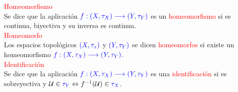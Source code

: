 \documentclass{article}
\begin{document}
\textcolor{red}{Homeomorfismo}\\
Se dice que la aplicación $\textcolor{blue}{f:(X,\tau_X)\longrightarrow (Y, \tau_Y)}$ es un \textcolor{red}{homeomorfismo} si es continua, biyectiva y su inversa es continua.\\

\textcolor{red}{Homeomorfo}\\
Los espacios topológicos $\textcolor{blue}{(X,\tau_x)}$ y $\textcolor{blue}{(Y,\tau_Y)}$ se dicen \textcolor{red}{homeomorfos} si existe un homeomorfismo $\textcolor{blue}{f:(X,\tau_X)\longrightarrow (Y, \tau_Y)}$.\\

\textcolor{red}{Identificación}\\
Se dice que la aplicación $\textcolor{blue}{f:(X,\tau_X)\longrightarrow (Y, \tau_Y)}$ es una \textcolor{red}{identificación} si es sobreyectiva y $\mathcal{U}\in \textcolor{blue}{\tau_Y} \Leftrightarrow f^{-1}(\mathcal{U})\in \textcolor{blue}{\tau_X}$.
\end{document}
